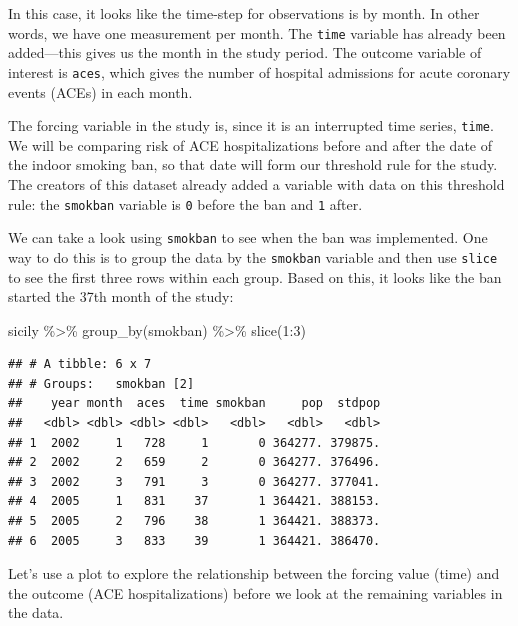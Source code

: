 \documentclass[
]{book}
\newenvironment{Shaded}{\begin{snugshade}}{\end{snugshade}}
\newcommand{\DecValTok}[1]{\textcolor[rgb]{0.00,0.00,0.81}{#1}}
\newcommand{\FunctionTok}[1]{\textcolor[rgb]{0.00,0.00,0.00}{#1}}
\newcommand{\NormalTok}[1]{#1}
\newcommand{\SpecialCharTok}[1]{\textcolor[rgb]{0.00,0.00,0.00}{#1}}
\begin{document}
In this case, it looks like the time-step for observations is by month. In other words, we have one measurement per month. The \texttt{time} variable has already been added---this gives us the month in the study period. The outcome variable of interest is \texttt{aces}, which gives the number of hospital admissions for acute coronary events (ACEs) in each month.

The forcing variable in the study is, since it is an interrupted time series, \texttt{time}. We will be comparing risk of ACE hospitalizations before and after the date of the indoor smoking ban, so that date will form our threshold rule for the study. The creators of this dataset already added a variable with data on this threshold rule: the \texttt{smokban} variable is \texttt{0} before the ban and \texttt{1} after.

We can take a look using \texttt{smokban} to see when the ban was implemented. One
way to do this is to group the data by the \texttt{smokban} variable and then use \texttt{slice} to see the first three rows within each group. Based on this, it looks like the ban started the 37th month of the study:

\begin{Shaded}
\begin{Highlighting}[]
\NormalTok{sicily }\SpecialCharTok{\%\textgreater{}\%}  
  \FunctionTok{group\_by}\NormalTok{(smokban) }\SpecialCharTok{\%\textgreater{}\%} 
  \FunctionTok{slice}\NormalTok{(}\DecValTok{1}\SpecialCharTok{:}\DecValTok{3}\NormalTok{)}
\end{Highlighting}
\end{Shaded}

\begin{verbatim}
## # A tibble: 6 x 7
## # Groups:   smokban [2]
##    year month  aces  time smokban     pop  stdpop
##   <dbl> <dbl> <dbl> <dbl>   <dbl>   <dbl>   <dbl>
## 1  2002     1   728     1       0 364277. 379875.
## 2  2002     2   659     2       0 364277. 376496.
## 3  2002     3   791     3       0 364277. 377041.
## 4  2005     1   831    37       1 364421. 388153.
## 5  2005     2   796    38       1 364421. 388373.
## 6  2005     3   833    39       1 364421. 386470.
\end{verbatim}

Let's use a plot to explore the relationship between the forcing value (time) and the outcome (ACE hospitalizations) before we look at the remaining variables in the data.
\end{document}
